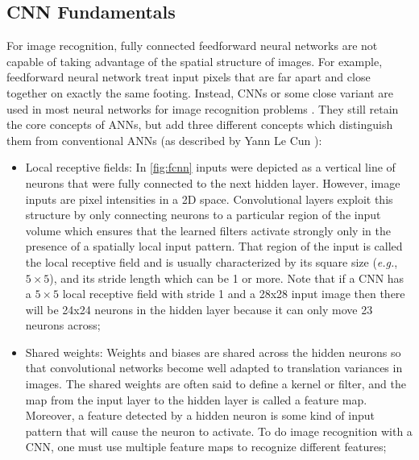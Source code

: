 \subsection{CNN Fundamentals}
    For image recognition, fully connected feedforward neural networks are not capable of taking advantage of the spatial structure of images. For example, feedforward neural network treat input pixels that are far apart and close together on exactly the same footing. Instead, \ac{CNN}s or some close variant are used in most neural networks for image recognition problems \cite{Nielsen2017a}. They still retain the core concepts of \ac{ANN}s, but add three different concepts which distinguish them from conventional \ac{ANN}s (as described by Yann Le Cun \cite{LeCun1989}):
    \begin{itemize}
        \item Local receptive fields: In \autoref{fig:fcnn} inputs were depicted as a vertical line of neurons that were fully connected to the next hidden layer. However, image inputs are pixel intensities in a 2D space. Convolutional layers exploit this structure by only connecting neurons to a particular region of the input volume which ensures that the learned filters activate strongly only in the presence of a spatially local input pattern. That region of the input is called the local receptive field and is usually characterized by its square size (\textit{e.g.}, $5 \times 5$), and its stride length which can be 1 or more. Note that if a \ac{CNN} has a $5 \times 5$ local receptive field with stride 1 and a 28x28 input image then there will be 24x24 neurons in the hidden layer because it can only move 23 neurons across;  
        
        \item Shared weights: Weights and biases are shared across the hidden neurons so that convolutional networks become well adapted to translation variances in images. The shared weights are often said to define a kernel or filter, and the map from the input layer to the hidden layer is called a feature map. Moreover, a feature detected by a hidden neuron is some kind of input pattern that will cause the neuron to activate. To do image recognition with a \ac{CNN}, one must use multiple feature maps to recognize different features;
        

\end{itemize}
